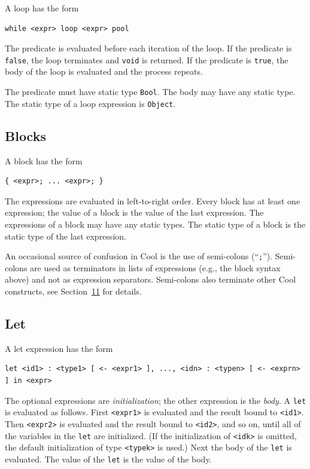 \documentclass[]{article}
\begin{document}
A loop has the form

\begin{verbatim}
while <expr> loop <expr> pool
\end{verbatim}

The predicate is evaluated before each iteration of the loop. If the
predicate is \texttt{false}, the loop terminates and \texttt{void} is
returned. If the predicate is \texttt{true}, the body of the loop is
evaluated and the process repeats.

The predicate must have static type \texttt{Bool}. The body may have any
static type. The static type of a loop expression is \texttt{Object}.

\subsection{Blocks}

A block has the form

\begin{verbatim}
{ <expr>; ... <expr>; }
\end{verbatim}

The expressions are evaluated in left-to-right order. Every block has at
least one expression; the value of a block is the value of the last
expression. The expressions of a block may have any static types. The
static type of a block is the static type of the last expression.

An occasional source of confusion in Cool is the use of semi-colons
(``\texttt{;}''). Semi-colons are used as terminators in lists of
expressions (e.g., the block syntax above) and not as expression
separators. Semi-colons also terminate other Cool constructs, see
Section~\href{node39.html\#sec-gram}{11} for details.

\subsection{Let}

A let expression has the form

\begin{verbatim}
let <id1> : <type1> [ <- <expr1> ], ..., <idn> : <typen> [ <- <exprn> ] in <expr>
\end{verbatim}

The optional expressions are \emph{initialization}; the other expression
is the \emph{body}. A \texttt{let} is evaluated as follows. First
\texttt{\textless{}expr1\textgreater{}} is evaluated and the result
bound to \texttt{\textless{}id1\textgreater{}}. Then
\texttt{\textless{}expr2\textgreater{}} is evaluated and the result
bound to \texttt{\textless{}id2\textgreater{}}, and so on, until all of
the variables in the \texttt{let} are initialized. (If the
initialization of \texttt{\textless{}idk\textgreater{}} is omitted, the
default initialization of type \texttt{\textless{}typek\textgreater{}}
is used.) Next the body of the \texttt{let} is evaluated. The value of
the \texttt{let} is the value of the body.
\end{document}
